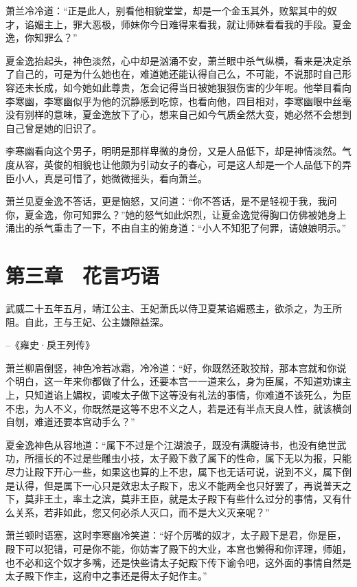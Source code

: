 萧兰冷冷道：“正是此人，别看他相貌堂堂，却是一个金玉其外，败絮其中的奴才，谄媚主上，罪大恶极，师妹你今日难得来看我，就让师妹看看我的手段。夏金逸，你知罪么？”

夏金逸抬起头，神色淡然，心中却是汹涌不安，萧兰眼中杀气纵横，看来是决定杀了自己的，可是为什么她也在，难道她还能认得自己么，不可能，不说那时自己形容还未长成，如今她如此尊贵，怎会记得当日被她狠狠伤害的少年呢。他举目看向李寒幽，李寒幽似乎为他的沉静感到吃惊，也看向他，四目相对，李寒幽眼中丝毫没有别样的意味，夏金逸放下了心，想来自己如今气质全然大变，她必然不会想到自己曾是她的旧识了。

李寒幽看向这个男子，明明是那样卑微的身份，又是人品低下，却是神情淡然。气度从容，英俊的相貌也让他颇为引动女子的春心，可是这人却是一个人品低下的弄臣小人，真是可惜了，她微微摇头，看向萧兰。

萧兰见夏金逸不答话，更是恼怒，又问道：“你不答话，是不是轻视于我，我问你，夏金逸，你可知罪么？”她的怒气如此炽烈，让夏金逸觉得胸口仿佛被她身上涌出的杀气重击了一下，不由自主的俯身道：“小人不知犯了何罪，请娘娘明示。”

\chapter{第三章　花言巧语}

武威二十五年五月，靖江公主、王妃萧氏以侍卫夏某谄媚惑主，欲杀之，为王所阻。自此，王与王妃、公主嫌隙益深。

--《雍史·戾王列传》

萧兰柳眉倒竖，神色冷若冰霜，冷冷道：“好，你既然还敢狡辩，那本宫就和你说个明白，这一年来你都做了什么，还要本宫一一道来么，身为臣属，不知道劝谏主上，只知道谄上媚权，调唆太子做下这等没有礼法的事情，你难道不该死么，为臣不忠，为人不义，你既然是这等不忠不义之人，若是还有半点天良人性，就该横剑自刎，难道还要本宫动手么？”

夏金逸神色从容地道：“属下不过是个江湖浪子，既没有满腹诗书，也没有绝世武功，所擅长的不过是些雕虫小技，太子殿下救了属下的性命，属下无以为报，只能尽力让殿下开心一些，如果这也算的上不忠，属下也无话可说，说到不义，属下倒是认得，但是属下一心只是效忠太子殿下，忠义不能两全也只好罢了，再说普天之下，莫非王土，率土之滨，莫非王臣，就是太子殿下有些什么过分的事情，又有什么关系，若非如此，您又何必杀人灭口，而不是大义灭亲呢？”

萧兰顿时语塞，这时李寒幽冷笑道：“好个厉嘴的奴才，太子殿下是君，你是臣，殿下可以犯错，可是你不能，你妨害了殿下的大业，本宫也懒得和你评理，师姐，也不必和这个奴才多嘴，还是快些请太子妃殿下传下谕令吧，这外面的事情自然是太子殿下作主，这府中之事还是得太子妃作主。”

